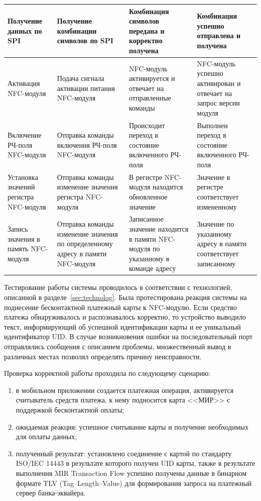 \begin{longtable}[l]{| P{0.18\textwidth} | P{0.2\textwidth} | P{0.26\textwidth} | P{0.26\textwidth}|}
    Получение данных по SPI &
    Получение комбинации символов по SPI &
    Комбинация символов передана и корректно получена &
    Комбинация успешно отправлена и получена \\
    \hline

    Активация NFC-модуля &
    Подача сигнала активации питания NFC-модуля &
    NFC-модуль активируется и отвечает на отправленные команды &
    NFC-модуль успешно активирован и отвечает на запрос версии модуля \\
    \hline

    Включение РЧ-поля NFC-модуля &
    Отправка команды включения РЧ-поля NFC-модуля &
    Происходит переход в состояние включенного РЧ-поля &
    Выполнен переход в состояние включенного РЧ-поля \\
    \hline

    Установка значений регистра NFC-модуля &
    Отправка команды изменение значения регистра NFC-модуля &
    В регистре NFC-модуля находится обновленное значение &
    Значение в регистре соответствует измененному \\
    \hline

    Запись значения в память NFC-модуля &
    Отправка команды изменение значения по определенному адресу в памяти NFC-модуля &
    Записанное значение находится в памяти NFC-модуля по указанному в команде адресу &
    Значение по указанному адресу в памяти соответствует записанному \\
    \hline

\end{longtable}

Тестирование работы системы проводилось в соответствии с технологией, описанной в разделе~\ref{sec:technolog}.
Была протестирована реакция системы на поднесение бесконтактной платежный карты к NFC-модулю.
Если средство платежа обнаруживалось и распознавалось корректно, то устройство выводило текст, информирующий об успешной идентификации карты и ее уникальный идентификатор UID.
В случае возникновения ошибки на последовательный порт отправлялись сообщения с описанием проблемы, множественный вывод в различных местах позволял определять причину неисправности.

Проверка корректной работы проходила по следующему сценарию:
\begin{enumerate}
    \item в мобильном приложении создается платежная операция, активируется считыватель средств платежа, к нему подносится карта <<МИР>> с поддержкой бесконтактной оплаты;
    \item ожидаемая реакция: успешное считывание карты и получение необходимых для оплаты данных;
    \item полученный результат: установлено соединение с картой по стандарту ISO/IEC 14443 в результате которого получен UID карты, также в результате выполнения MIR Transaction Flow успешно получены данные в бинарном формате TLV (Tag--Length--Value) для формирования запроса на платежный сервер банка-эквайера.
\end{enumerate}


